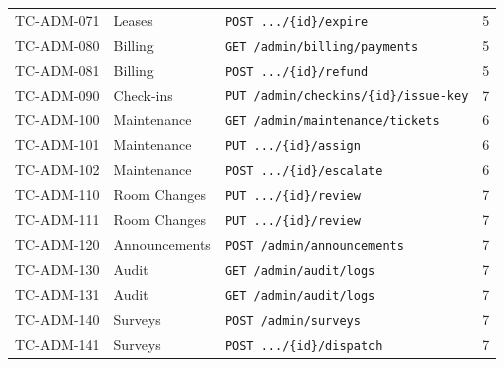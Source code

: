 \documentclass[12pt,a4paper]{article}
\begin{document}
\begin{longtable}{L{2.5cm} L{4cm} L{6cm} L{2cm}}
TC-ADM-071 & Leases & \texttt{POST .../\{id\}/expire} & 5 \\
TC-ADM-080 & Billing & \texttt{GET /admin/billing/payments} & 5 \\
TC-ADM-081 & Billing & \texttt{POST .../\{id\}/refund} & 5 \\
TC-ADM-090 & Check-ins & \texttt{PUT /admin/checkins/\{id\}/issue-key} & 7 \\
TC-ADM-100 & Maintenance & \texttt{GET /admin/maintenance/tickets} & 6 \\
TC-ADM-101 & Maintenance & \texttt{PUT .../\{id\}/assign} & 6 \\
TC-ADM-102 & Maintenance & \texttt{POST .../\{id\}/escalate} & 6 \\
TC-ADM-110 & Room Changes & \texttt{PUT .../\{id\}/review} & 7 \\
TC-ADM-111 & Room Changes & \texttt{PUT .../\{id\}/review} & 7 \\
TC-ADM-120 & Announcements & \texttt{POST /admin/announcements} & 7 \\
TC-ADM-130 & Audit & \texttt{GET /admin/audit/logs} & 7 \\
TC-ADM-131 & Audit & \texttt{GET /admin/audit/logs} & 7 \\
TC-ADM-140 & Surveys & \texttt{POST /admin/surveys} & 7 \\
TC-ADM-141 & Surveys & \texttt{POST .../\{id\}/dispatch} & 7 \\
\end{longtable}
\end{document}
